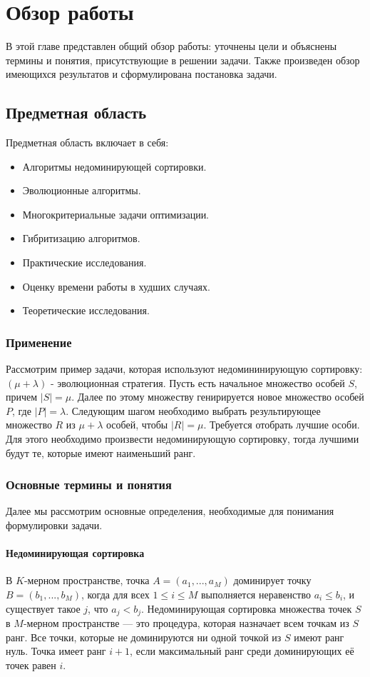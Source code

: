 
\chapter{Обзор работы}
\label{chapter1}

В этой главе представлен общий обзор работы: уточнены цели и объяснены термины и понятия, присутствующие в решении задачи. Также произведен обзор имеющихся результатов и сформулирована постановка задачи.

\section{Предметная область}
Предметная область включает в себя:

\begin{itemize}
\item Алгоритмы недоминирующей сортировки.
\item Эволюционные алгоритмы.
\item Многокритериальные задачи оптимизации.
\item Гибритизацию алгоритмов.
\item Практические исследования.
\item Оценку времени работы в худших случаях.
\item Теоретические исследования.
\end{itemize}

\subsection{Применение}
Рассмотрим пример задачи, которая используют недомининирующую сортировку: $(\mu + \lambda)$ - эволюционная стратегия. Пусть есть начальное множество особей $S$, причем $|S| = \mu$. Далее по этому множеству генирируется новое множество особей $P$, где  $|P| = \lambda$. Следующим шагом необходимо выбрать результирующее множество $R$ из $\mu + \lambda$ особей, чтобы $|R|= \mu$. Требуется отобрать лучшие особи. Для этого необходимо произвести недоминирующую сортировку, тогда лучшими будут те, которые имеют наименьший ранг.

\subsection{Основные термины и понятия}

Далее мы рассмотрим основные определения, необходимые для понимания формулировки задачи. 

\subsubsection{Недоминирующая сортировка}
В $K$-мерном пространстве, точка $A = (a_1,...,a_M)$ доминирует точку $B = (b_1,...,b_M)$, когда для всех $1 \leq i \leq M$ выполняется неравенство $a_i\leq b_i$, и существует такое $j$, что $a_j < b_j$. Недоминирующая сортировка множества точек $S$ в $M$-мерном пространстве — это процедура, которая назначает всем точкам из $S$ ранг. Все точки, которые не доминируются ни одной точкой из $S$ имеют ранг нуль. Точка имеет ранг $i+1$, если максимальный ранг среди доминирующих её точек равен $i$.

